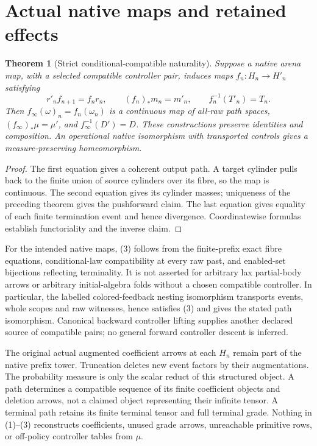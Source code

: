 \documentclass[11pt]{article}
\newtheorem{theorem}{Theorem}\newtheorem{proposition}{Proposition}
\begin{document}
\section{Actual native maps and retained effects}
\begin{theorem}[Strict conditional-compatible naturality]
Suppose a native arena map, with a selected compatible controller pair, induces maps $f_n:H_n\to H'_n$ satisfying
\[
 r'_nf_{n+1}=f_nr_n,\qquad (f_n)_*m_n=m'_n,
 \qquad f_n^{-1}(T'_n)=T_n.                            \tag{3}
\]
Then $f_\infty(\omega)_n=f_n(\omega_n)$ is a continuous map of all-raw path spaces, $(f_\infty)_*\mu=\mu'$, and $f_\infty^{-1}(D')=D$. These constructions preserve identities and composition. An operational native isomorphism with transported controls gives a measure-preserving homeomorphism.
\end{theorem}
\begin{proof}
The first equation gives a coherent output path. A target cylinder pulls back to the finite union of source cylinders over its fibre, so the map is continuous. The second equation gives its cylinder masses; uniqueness of the preceding theorem gives the pushforward claim. The last equation gives equality of each finite termination event and hence divergence. Coordinatewise formulas establish functoriality and the inverse claim.
\end{proof}
For the intended native maps, (3) follows from the finite-prefix exact fibre equations, conditional-law compatibility at every raw past, and enabled-set bijections reflecting terminality. It is not asserted for arbitrary lax partial-body arrows or arbitrary initial-algebra folds without a chosen compatible controller. In particular, the labelled colored-feedback nesting isomorphism transports events, whole scopes and raw witnesses, hence satisfies (3) and gives the stated path isomorphism. Canonical backward controller lifting supplies another declared source of compatible pairs; no general forward controller descent is inferred.

The original actual augmented coefficient arrows at each $H_n$ remain part of the native prefix tower. Truncation deletes new event factors by their augmentations. The probability measure is only the scalar reduct of this structured object. A path determines a compatible sequence of its finite coefficient objects and deletion arrows, not a claimed object representing their infinite tensor. A terminal path retains its finite terminal tensor and full terminal grade. Nothing in (1)--(3) reconstructs coefficients, unused grade arrows, unreachable primitive rows, or off-policy controller tables from $\mu$.
\end{document}
